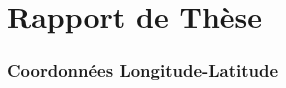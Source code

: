 \documentclass[11pt]{thesul}
\begin{document}
\DontWriteThisInToc   
\listoffigures

\WriteThisInToc
\FrameThisInToc
\NumberThisInToc
\part*{Rapport de Thèse}
\mainmatter





 






\Annexes

\section{Coordonnées Longitude-Latitude}

%





\end{document}
